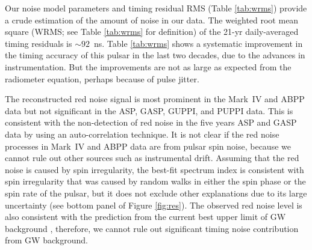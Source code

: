 Our noise model parameters and timing residual RMS (Table \ref{tab:wrms})
provide a crude estimation of the amount of noise in our data. The weighted
root mean square (WRMS; see Table \ref{tab:wrms} for definition) of
the 21-yr daily-averaged timing residuals is $\sim 92$~ns. 
Table \ref{tab:wrms} shows a systematic improvement in the timing accuracy of
this pulsar in the last two decades, due to the advances in instrumentation.
But the improvements are not as large as expected from the radiometer 
equation, perhaps because of pulse jitter. 

The reconstructed red noise signal is most prominent in the Mark~IV and ABPP data
but not significant in the ASP, GASP, GUPPI, and PUPPI data.
This is consistent with the non-detection of red noise in the five years
ASP and GASP data by \citet{pjl+13} using an auto-correlation technique.
It is not clear if the red noise processes in Mark~IV and ABPP data
are from pulsar spin noise, because we cannot rule out other sources such as
instrumental drift.
Assuming that the red noise is caused by spin irregularity,
the best-fit spectrum index is consistent with
spin irregularity that was caused by random walks in
either the spin phase or the spin rate of the pulsar, but it does not exclude other explanations
due to its large uncertainty (see bottom panel of Figure \ref{fig:res}).
The observed red noise level is also consistent with the prediction
from the current best upper limit of GW background \citep{src+13}, therefore,
we cannot rule out significant timing noise contribution from GW background. 


